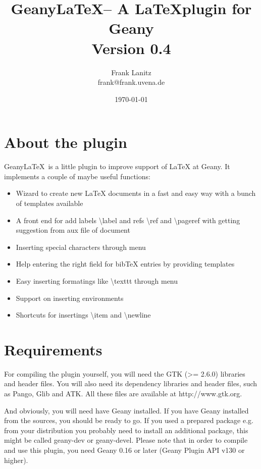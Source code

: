 \documentclass[/%
a4paper,%
10pt,%
oneside,%
DIV18,
headsepline,         %
plainheadsepline,
footsepline,         %
plainfootsepline,
bibtotoc,%
liststotoc,%
BCOR12mm,%
halfparskip,%
openany,%
]{scrartcl}
\title{Geany\LaTeX -- A \LaTeX plugin for Geany \\[1.5ex] \normalsize Version 0.4}
\author{Frank Lanitz \\ \small{frank@frank.uvena.de}}
\date{\today}
\begin{document}
\maketitle

\tableofcontents
\newpage

\section{About the plugin}

Geany\LaTeX\ is a little plugin to improve support of LaTeX at Geany. It
implements a couple of maybe useful functions:
\begin{itemize}
	\item Wizard to create new LaTeX documents in a fast and easy way
	 	  with a bunch of templates available
	\item A front end for add labels \textbackslash label{} and refs
	 	  \textbackslash ref{} and \textbackslash pageref{}
   		  with getting suggestion from aux file of document
	\item Inserting special characters through menu
	\item Help entering the right field for bibTeX entries by
		  providing templates
	\item Easy inserting formatings like \textbackslash texttt{}
		  through menu
	\item Support on inserting environments
	\item Shortcuts for insertings \textbackslash item and
		  \textbackslash newline
\end{itemize}


\section{Requirements}

For compiling the plugin yourself, you will need the GTK (>= 2.6.0)
libraries and header files. You will also need its dependency
libraries and header files, such as Pango, Glib and ATK. All these
files are available at http://www.gtk.org.

And obviously, you will need have Geany installed. If you have Geany
installed from the sources, you should be ready to go. If you used a
prepared package e.g. from your distribution you probably need to
install an additional package, this might be called geany-dev or
geany-devel. Please note that in order to compile and use this plugin,
you need Geany 0.16 or later (Geany Plugin API v130 or higher).
\end{document}
